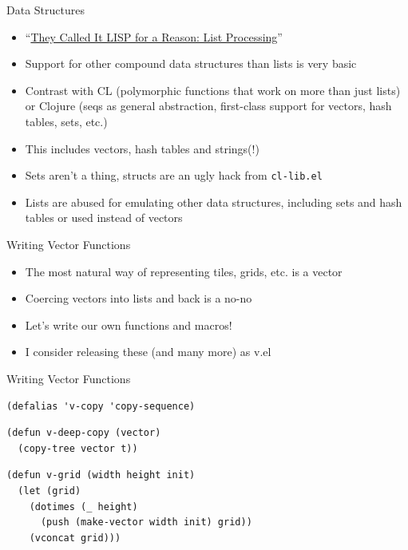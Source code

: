 \documentclass[presentation]{beamer}
\begin{document}
\begin{frame}[fragile,label=sec-4-3]{Data Structures}
 \begin{itemize}
\item “\href{http://gigamonkeys.com/book/they-called-it-lisp-for-a-reason-list-processing.html}{They Called It LISP for a Reason: List Processing}”
\item Support for other compound data structures than lists is very basic
\item Contrast with CL (polymorphic functions that work on more than just
lists) or Clojure (seqs as general abstraction, first-class support
for vectors, hash tables, sets, etc.)
\item This includes vectors, hash tables and strings(!)
\item Sets aren't a thing, structs are an ugly hack from \texttt{cl-lib.el}
\item Lists are abused for emulating other data structures, including
sets and hash tables or used instead of vectors
\end{itemize}
\end{frame}


\begin{frame}[label=sec-4-4]{Writing Vector Functions}
\begin{itemize}
\item The most natural way of representing tiles, grids, etc. is a vector
\item Coercing vectors into lists and back is a no-no
\item Let's write our own functions and macros!
\item I consider releasing these (and many more) as v.el
\end{itemize}
\end{frame}

\begin{frame}[fragile,label=sec-4-5]{Writing Vector Functions}
 \begin{verbatim}
(defalias 'v-copy 'copy-sequence)
\end{verbatim}

\begin{verbatim}
(defun v-deep-copy (vector)
  (copy-tree vector t))
\end{verbatim}

\begin{verbatim}
(defun v-grid (width height init)
  (let (grid)
    (dotimes (_ height)
      (push (make-vector width init) grid))
    (vconcat grid)))
\end{verbatim}
\end{frame}
\end{document}
